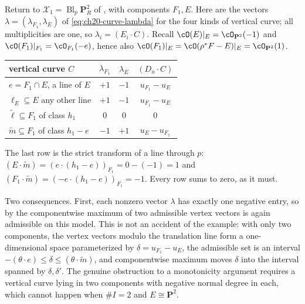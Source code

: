 \begin{example}
\label{ex:ch20-max-fails-naively}
Return to $\mathcal X_1=\operatorname{Bl}_p\mathbf P^2_R$ of
, with components $F_1,E$.  Here are the
vectors $\lambda=(\lambda_{F_1},\lambda_E)$ of
\eqref{eq:ch20-curve-lambda} for the four kinds of vertical curve; all
multiplicities are one, so $\lambda_i=(E_i\cdot C)$.  Recall
$\cO(E)|_E=\cO_{\mathbf P^2}(-1)$ and
$\cO(F_1)|_{F_1}=\cO_{F_1}(-e)$, hence also
$\cO(F_1)|_E=\cO(\rho^*F-E)|_E=\cO_{\mathbf P^2}(1)$.

\begin{center}
\small
\begin{tabular}{p{}|c|c|c}
\toprule
\textbf{vertical curve $C$}&$\lambda_{F_1}$&$\lambda_E$
 &$(D_u\cdot C)$\\
\midrule
$e=F_1\cap E$, a line of $E$&$+1$&$-1$&$u_{F_1}-u_E$\\
$\ell_E\subseteq E$ any other line&$+1$&$-1$&$u_{F_1}-u_E$\\
$\tilde\ell\subseteq F_1$ of class $h_1$&$0$&$0$&$0$\\
$\tilde m\subseteq F_1$ of class $h_1-e$&$-1$&$+1$&$u_E-u_{F_1}$\\
\bottomrule
\end{tabular}
\end{center}

The last row is the strict transform of a line through $p$:
$(E\cdot\tilde m)=(e\cdot(h_1-e))_{F_1}=0-(-1)=1$ and
$(F_1\cdot\tilde m)=(-e\cdot(h_1-e))_{F_1}=-1$.  Every row sums to zero,
as it must.

Two consequences.  First, each nonzero vector $\lambda$ has exactly one negative entry,
so by  the componentwise maximum of two
admissible vertex vectors is again admissible on this model.  This is not an
accident of the example: with only two components, the vertex vectors modulo
the translation line form a one-dimensional space parameterized by
$\delta=u_{F_1}-u_E$, the admissible set is an interval
$-(\theta\cdot e)\le\delta\le(\theta\cdot\tilde m)$, and componentwise
maximum moves $\delta$ into the interval spanned by $\delta,\delta'$.
The genuine obstruction to a monotonicity argument requires a vertical curve
lying in two components with negative normal degree in each, which
cannot happen when $\#I=2$ and $E\cong\mathbf P^2$.


\end{example}
